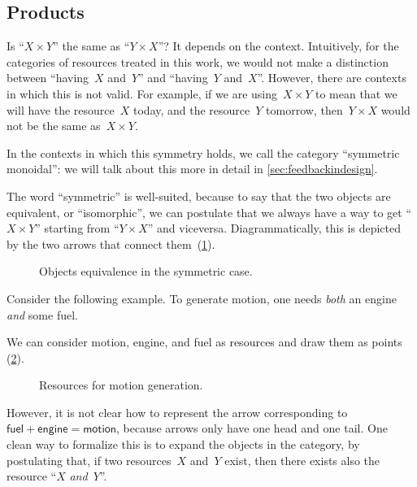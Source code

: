 \label{sec:productset}
\subsection{Products}
Is ``$X \times Y$'' the same as ``$Y \times X$''?
It depends on the context. Intuitively, for the categories of resources treated in this work, we would not make a distinction between ``having~$X$ and~$Y$'' and ``having~$Y$ and~$X$''.
However, there are contexts in which this is not valid. For example, if we are
using~$X \times Y$ to mean that we will have the resource~$X$ today, and the
resource~$Y$ tomorrow, then~$Y \times X$ would not be the same as~$X \times Y$. 

In the contexts in which this symmetry holds, we call the category ``symmetric monoidal'': we will talk about this more in detail in \cref{sec:feedbackindesign}.

The word ``symmetric'' is well-suited, because to say that the two objects are equivalent, or ``isomorphic'', we can postulate that we always have a way to get
``$X \times Y$'' starting from ``$Y \times X$'' and viceversa. Diagrammatically, this is depicted by the two arrows that connect them~(\cref{fig:e17}).

\begin{figure}[h!]
    \centering
    \caption{Objects equivalence in the symmetric case. \label{fig:e17}}
\end{figure}

Consider the following example. To generate \textsf{motion}, one needs \emph{both} an \textsf{engine} \emph{and} some \textsf{fuel}.

We can consider \textsf{motion}, \textsf{engine}, and \textsf{fuel} as resources and draw them as points (\cref{fig:e11}).

\begin{figure}[h!]
    \centering
    \caption{Resources for motion generation. \label{fig:e11}}
\end{figure}

However, it is not clear how to represent the arrow corresponding to~$\mathsf{fuel} + \mathsf{engine} = \mathsf{motion}$, because arrows only have one head and one tail.
One clean way to formalize this is to expand the objects in the category, by postulating that, if two resources~$X$ and~$Y$ exist, then there exists also the resource ``$X$ \emph{and}~$Y$''.

